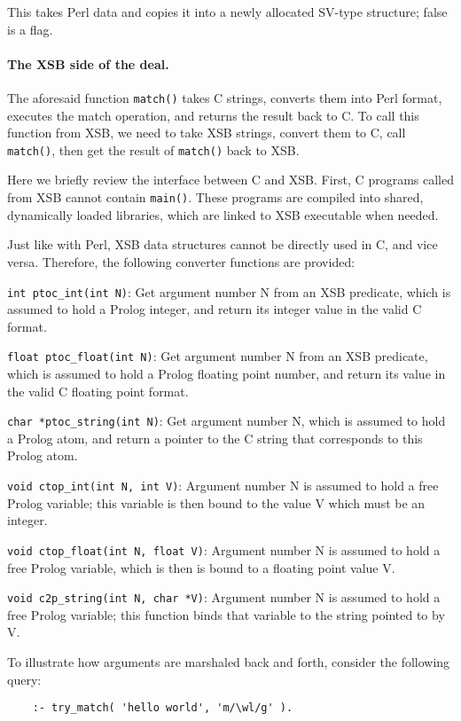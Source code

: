 \documentclass{article}
\begin{document}
{This takes Perl data and copies it into a newly allocated SV-type
structure; false is a flag.

\paragraph{The XSB side of the deal.}
The aforesaid function {\tt match()}  takes C strings, converts them into
Perl format, executes the match operation, and returns the result back to C.
To call this function from XSB, we need to take XSB strings, convert them
to C, call {\tt match()}, then get the result of {\tt match()} back to XSB.  

Here we briefly review the interface between C and XSB. First, C programs
called from XSB cannot contain {\tt main()}. These programs are compiled
into shared, dynamically loaded libraries, which are linked to XSB
executable when needed.

Just like with Perl, XSB data structures cannot be directly used in C, and
vice versa. Therefore, the following converter functions are provided:

\noindent
{\tt int ptoc\_int(int N)}: Get argument number N from an XSB predicate,
which is assumed to hold a Prolog integer, and return its integer value in
the valid C format.

\noindent
{\tt float ptoc\_float(int N)}: Get argument number N from an XSB predicate,
which is assumed to hold a Prolog floating point number, and return its
value in the valid C floating point format.

\noindent
{\tt char *ptoc\_string(int N)}: Get argument number N, which is assumed to
hold a Prolog atom, and return a pointer to the C string that corresponds
to this Prolog atom.

\noindent
{\tt void ctop\_int(int N, int V)}: Argument number N is assumed to hold a
free Prolog variable; this variable is then bound to the value V which must
be an integer.

\noindent
{\tt void ctop\_float(int N, float V)}: Argument number N is assumed to hold a
free Prolog variable, which is then is bound to a floating point value V.

\noindent
{\tt void c2p\_string(int N, char *V)}: Argument number N is assumed to hold a
free Prolog variable; this function binds that variable to the string
pointed to by V.


To illustrate how arguments are marshaled back and forth, consider
the following query:

\begin{verbatim}
    :- try_match( 'hello world', 'm/\wl/g' ).
\end{verbatim}


}
\end{document}
